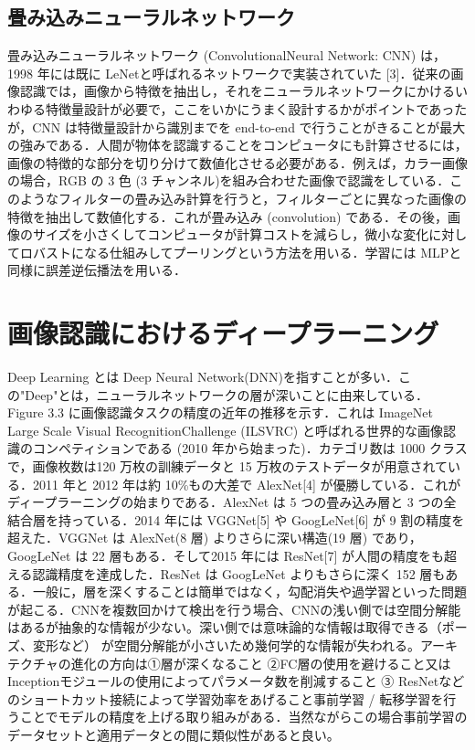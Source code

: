 \subsection*{畳み込みニューラルネットワーク}
畳み込みニューラルネットワーク (ConvolutionalNeural Network: CNN) は，1998 年には既に LeNetと呼ばれるネットワークで実装されていた [3]．従来の画像認識では，画像から特徴を抽出し，それをニューラルネットワークにかけるいわゆる特徴量設計が必要で，ここをいかにうまく設計するかがポイントであったが，CNN は特徴量設計から識別までを end-to-end で行うことがきることが最大の強みである．人間が物体を認識することをコンピュータにも計算させるには，画像の特徴的な部分を切り分けて数値化させる必要がある．例えば，カラー画像の場合，RGB の 3 色 (3 チャンネル)を組み合わせた画像で認識をしている．このようなフィルターの畳み込み計算を行うと，フィルターごとに異なった画像の特徴を抽出して数値化する．これが畳み込み (convolution) である．その後，画像のサイズを小さくしてコンピュータが計算コストを減らし，微小な変化に対してロバストになる仕組みしてプーリングという方法を用いる．学習には MLPと同様に誤差逆伝播法を用いる．

\section{画像認識におけるディープラーニング}
Deep Learning とは Deep Neural Network(DNN)を指すことが多い．この"Deep"とは，ニューラルネットワークの層が深いことに由来している．
Figure 3.3 に画像認識タスクの精度の近年の推移を示す．これは ImageNet Large Scale Visual RecognitionChallenge (ILSVRC) と呼ばれる世界的な画像認識のコンペティションである (2010 年から始まった)．カテゴリ数は 1000 クラスで，画像枚数は120 万枚の訓練データと 15 万枚のテストデータが用意されている．2011 年と 2012 年は約 10\%もの大差で AlexNet[4] が優勝している．これがディープラーニングの始まりである．AlexNet は 5 つの畳み込み層と 3 つの全結合層を持っている．2014 年には VGGNet[5] や GoogLeNet[6] が 9 割の精度を超えた．VGGNet は AlexNet(8 層) よりさらに深い構造(19 層) であり，GoogLeNet は 22 層もある．そして2015 年には ResNet[7] が人間の精度をも超える認識精度を達成した．ResNet は GoogLeNet よりもさらに深く 152 層もある．一般に，層を深くすることは簡単ではなく，勾配消失や過学習といった問題が起こる．CNNを複数回かけて検出を行う場合、CNNの浅い側では空間分解能はあるが抽象的な情報が少ない。深い側では意味論的な情報は取得できる（ポーズ、変形など） が空間分解能が小さいため幾何学的な情報が失われる。アーキテクチャの進化の方向は①層が深くなること ②FC層の使用を避けること又はInceptionモジュールの使用によってパラメータ数を削減すること ③ ResNetなどのショートカット接続によって学習効率をあげること事前学習 / 転移学習を行うことでモデルの精度を上げる取り組みがある．当然ながらこの場合事前学習のデータセットと適用データとの間に類似性があると良い。

